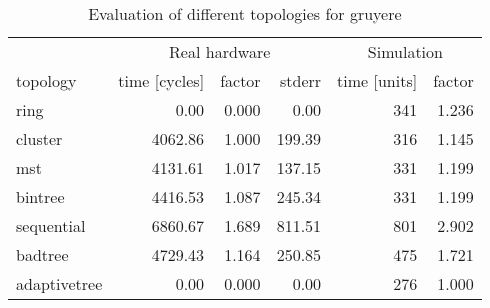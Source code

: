 \begin{table}[htb]
  \centering
  \begin{tabular}{lrrrrr}
  \toprule
  & \multicolumn{3}{c}{Real hardware} & \multicolumn{2}{c}{Simulation} \\
  topology & time [cycles] & factor & stderr & time [units] & factor \\
  \midrule
  ring & 0.00 & 0.000 & 0.00 & 341 & 1.236 \\
  cluster & 4062.86 & 1.000 & 199.39 & 316 & 1.145 \\
  mst & 4131.61 & 1.017 & 137.15 & 331 & 1.199 \\
  bintree & 4416.53 & 1.087 & 245.34 & 331 & 1.199 \\
  sequential & 6860.67 & 1.689 & 811.51 & 801 & 2.902 \\
  badtree & 4729.43 & 1.164 & 250.85 & 475 & 1.721 \\
  adaptivetree & 0.00 & 0.000 & 0.00 & 276 & 1.000 \\
  \midrule
  \end{tabular}
  \caption{Evaluation of different topologies for gruyere}
  \label{tab:gruyere}
\end{table}
